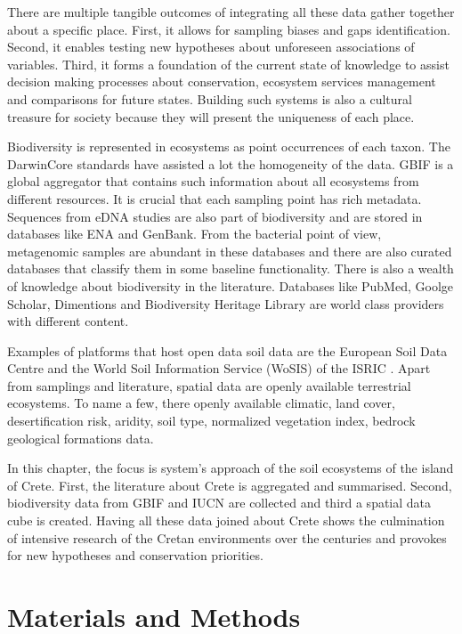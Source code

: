 There are multiple tangible outcomes of integrating all these data gather together about a
specific place. First, it allows for sampling biases and gaps identification. Second, 
it enables testing new hypotheses about unforeseen associations of variables. Third, 
it forms a foundation of the current state of knowledge to assist decision making 
processes about conservation, ecosystem services management and comparisons for 
future states. Building such systems is also a cultural treasure for society because
they will present the uniqueness of each place.

Biodiversity is represented in ecosystems as point occurrences of each taxon. The
DarwinCore standards have assisted a lot the homogeneity of the data. GBIF is a 
global aggregator that contains such information about all ecosystems from 
different resources. It is crucial that each sampling point has rich metadata. 
Sequences from eDNA studies are also part of biodiversity and are stored in 
databases like ENA and GenBank.
From the bacterial point of view, metagenomic samples are abundant in these 
databases and there are also curated databases that classify them in some baseline functionality. 
There is also a wealth of knowledge about biodiversity in the literature. 
Databases like PubMed, Goolge Scholar, Dimentions and Biodiversity Heritage Library 
are world class providers with different content.

Examples of platforms that host open data soil data are the 
European Soil Data Centre \parencite{Panagos2022} and the World Soil Information
Service (WoSIS) of the ISRIC \parencite{Batjes2024}. Apart from samplings and literature,
spatial data are openly available terrestrial ecosystems.
To name a few, there openly available climatic, land cover, desertification risk, aridity, soil type, normalized
vegetation index, bedrock geological formations data.

In this chapter, the focus is system's approach of the soil ecosystems of the island of Crete.
First, the literature about Crete is aggregated and summarised. Second, biodiversity data
from GBIF and IUCN are collected and third a spatial data cube is created. 
Having all these data joined about Crete shows the culmination of intensive 
research of the Cretan environments over the centuries and provokes for new
hypotheses and conservation priorities.


\section{Materials and Methods}\label{integration_methods}

